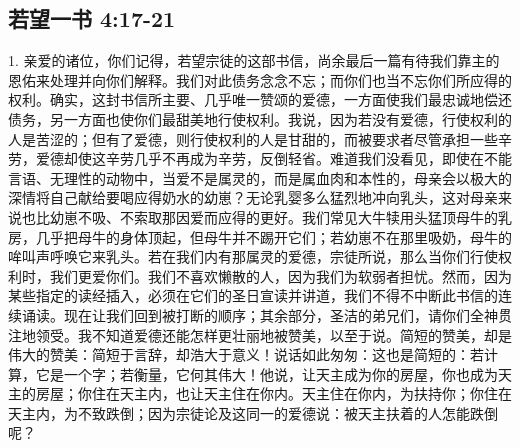 
\subsection{若望一书 4:17-21}

\par

1. 亲爱的诸位，你们记得，若望宗徒的这部书信，尚余最后一篇有待我们靠主的恩佑来处理并向你们解释。我们对此债务念念不忘；而你们也当不忘你们所应得的权利。确实，这封书信所主要、几乎唯一赞颂的爱德，一方面使我们最忠诚地偿还债务，另一方面也使你们最甜美地行使权利。我说，因为若没有爱德，行使权利的人是苦涩的；但有了爱德，则行使权利的人是甘甜的，而被要求者尽管承担一些辛劳，爱德却使这辛劳几乎不再成为辛劳，反倒轻省。难道我们没看见，即使在不能言语、无理性的动物中，当爱不是属灵的，而是属血肉和本性的，母亲会以极大的深情将自己献给要喝应得奶水的幼崽？无论乳婴多么猛烈地冲向乳头，这对母亲来说也比幼崽不吸、不索取那因爱而应得的更好。我们常见大牛犊用头猛顶母牛的乳房，几乎把母牛的身体顶起，但母牛并不踢开它们；若幼崽不在那里吸奶，母牛的哞叫声呼唤它来乳头。若在我们内有那属灵的爱德，宗徒所说，那么当你们行使权利时，我们更爱你们。我们不喜欢懒散的人，因为我们为软弱者担忧。然而，因为某些指定的读经插入，必须在它们的圣日宣读并讲道，我们不得不中断此书信的连续诵读。现在让我们回到被打断的顺序；其余部分，圣洁的弟兄们，请你们全神贯注地领受。我不知道爱德还能怎样更壮丽地被赞美，以至于说。简短的赞美，却是伟大的赞美：简短于言辞，却浩大于意义！说话如此匆匆：这也是简短的：若计算，它是一个字；若衡量，它何其伟大！他说，让天主成为你的房屋，你也成为天主的房屋；你住在天主内，也让天主住在你内。天主住在你内，为扶持你；你住在天主内，为不致跌倒；因为宗徒论及这同一的爱德说：被天主扶着的人怎能跌倒呢？\par

